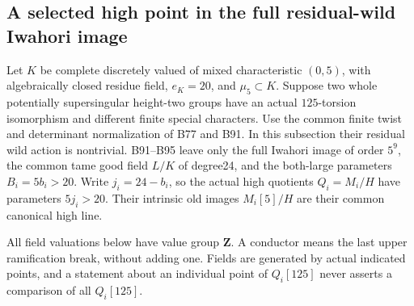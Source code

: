 \subsection{A selected high point in the full residual-wild Iwahori image}

Let $K$ be complete discretely valued of mixed characteristic $(0,5)$,
with algebraically closed residue field, $e_K=20$, and $\mu _5\subset K$.
Suppose two whole potentially supersingular height-two groups have an
actual $125$-torsion isomorphism and different finite special characters.
Use the common finite twist and determinant normalization of B77 and
B91. In this subsection their residual wild action is nontrivial.
B91--B95 leave only the full Iwahori image of order $5^9$, the common
tame good field $L/K$ of degree24, and the both-large parameters
$B_i=5b_i>20$. Write $j_i=24-b_i$, so the actual high quotients
$Q_i=M_i/H$ have parameters $5j_i>20$. Their intrinsic old images
$M_i[5]/H$ are their common canonical high line.

All field valuations below have value group $\mathbf Z$. A conductor
means the last upper ramification break, without adding one. Fields
are generated by actual indicated points, and a statement about an
individual point of $Q_i[125]$ never asserts a comparison of all
$Q_i[125]$.

